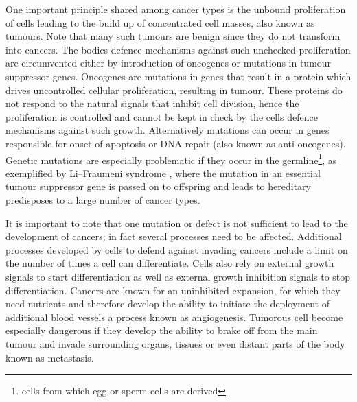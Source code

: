 One important principle shared among cancer types is the unbound proliferation of cells leading to the build up of concentrated cell masses, also known as tumours. Note that many such tumours are benign since they do not transform into cancers. The bodies defence mechanisms against such unchecked proliferation are circumvented either by introduction of oncogenes or mutations in tumour suppressor genes. Oncogenes are mutations in genes that result in a protein which drives uncontrolled cellular proliferation, resulting in tumour. These proteins do not respond to the natural signals that inhibit cell division, hence the proliferation is controlled and cannot be kept in check by the cells defence mechanisms against such growth. Alternatively mutations can occur in genes responsible for onset of apoptosis or DNA repair (also known as anti-oncogenes). Genetic mutations are especially problematic if they occur in the germline\footnote{cells from which egg or sperm cells are derived}, as exemplified by Li–Fraumeni syndrome \citep{Li:1969kl}, where the mutation in an essential tumour suppressor gene is passed on to offspring and leads to hereditary predisposes to a large number of cancer types. 

It is important to note that one mutation or defect is not sufficient to lead to the development of cancers; in fact several processes need to be affected. Additional processes developed by cells to defend against invading cancers include a limit on the number of times a cell can differentiate. Cells also rely on external growth signals to start differentiation as well as external growth inhibition signals to stop differentiation. Cancers are known for an uninhibited expansion, for which they need nutrients and therefore develop the ability to initiate the deployment of additional blood vessels a process known as angiogenesis. Tumorous cell become especially dangerous if they develop the ability to brake off from the main tumour and invade surrounding organs, tissues or even distant parts of the body known as metastasis.

